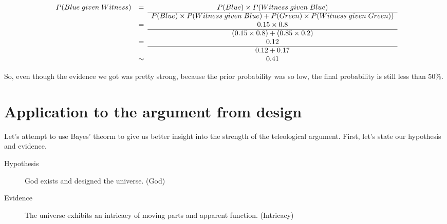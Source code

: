 \documentclass[letterpaper,10pt]{article}
\begin{document}
\[\begin{array}{ccc}
P(Blue\; given \; Witness) & = & P(Blue) \times P(Witness\; given\; Blue) \\ \cline{3-3}
 & & P(Blue)\times P(Witness\; given\; Blue) + P(Green)\times P(Witness\; given\; Green)) \\
 & = & 0.15 \times 0.8 \\ \cline{3-3}
 & & (0.15\times 0.8)+ (0.85\times 0.2) \\
 & = & 0.12 \\ \cline{3-3}
 & & 0.12+ 0.17 \\
 & \sim & 0.41 \\
\end{array}\]

So, even though the evidence we got was pretty strong, because the prior probability was so low, the final probability is still less than 50\%.


\section{Application to the argument from design}
Let's attempt to use Bayes' theorm to give us better insight into the strength of the teleological argument.  First, let's state our hypothesis and evidence.
\begin{description}
 \item [Hypothesis] God exists and designed the universe. (God)
 \item [Evidence] The universe exhibits an intricacy of moving parts and apparent function. (Intricacy)
\end{description}
\end{document}
